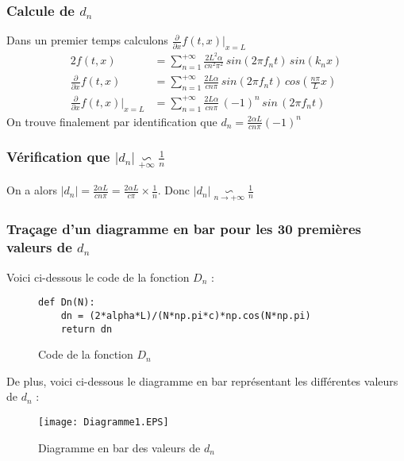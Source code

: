 \documentclass[12pt]{article}
\begin{document}
\subsubsection{Calcule de $d_n$}
Dans un premier temps calculons $\frac{\partial}{\partial x}f(t,x)\vert_{x=L}$ \\
\begin{alignat*}{2}
	f(t,x)										&= \sum\limits_{n=1}^{+\infty} \frac{2L^2 \alpha}{cn^2\pi^2}\,sin(2\pi f_n t)\,sin(k_n x) \\
	\frac{\partial}{\partial x}f(t,x)			&= \sum\limits_{n=1}^{+\infty} \frac{2L \alpha}{cn\pi}\,sin(2\pi f_n t)\,cos(\frac{n\pi}{L} x) \\
	\frac{\partial}{\partial x}f(t,x)\vert_{x=L}	&= \sum\limits_{n=1}^{+\infty} \frac{2L \alpha}{cn\pi}\,(-1)^n\, sin\,(2\pi f_n t)
\end{alignat*}
On trouve finalement par identification que $d_n=\frac{2\alpha L}{cn\pi}(-1)^n$

\subsubsection{Vérification que $\lvert d_n \rvert \underset{+\infty}{\backsim} \frac{1}{n}$}
On a alors $\lvert d_n \rvert = \frac{2\alpha L}{cn\pi}= \frac{2\alpha L}{c\pi}\times \frac{1}{n}$. Donc $\lvert d_n \rvert \underset{n\rightarrow +\infty}{\backsim} \frac{1}{n}$
\subsubsection{Traçage d'un diagramme en bar pour les 30 premières valeurs de $d_n$}
Voici ci-dessous le code de la fonction $D_n$ :
\begin{figure}[h]
\centering
\begin{minipage}{12cm} %
\begin{lstlisting}[style=stylepython]
def Dn(N):
    dn = (2*alpha*L)/(N*np.pi*c)*np.cos(N*np.pi)
    return dn

\end{lstlisting}
\end{minipage} %
\caption{Code de la fonction $D_n$}
\end{figure}
\newpage
\noindent De plus, voici ci-dessous le diagramme en bar représentant les différentes valeurs de $d_n$ :
\begin{figure}[!h]
\centering
\texttt{[image: Diagramme1.EPS]}
\caption{Diagramme en bar des valeurs de $d_n$}
\end{figure}
\end{document}
